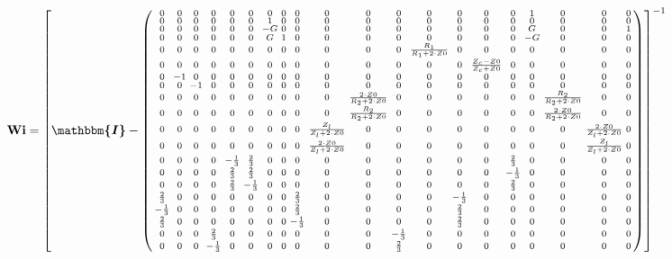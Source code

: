 \documentclass[10pt]{article} \usepackage{amsmath} \usepackage{bbold}
\begin{document}
\begin{equation} \mathbf{Wi} =  \left[ \boldsymbol{\mathbbm{I}}  -
\left(\begin{smallmatrix} 0 & 0 & 0 & 0 & 0 & 0 & 0 & 0 & 0 & 0 & 0 &
0 & 0 & 0 & 0 & 0 & 1 & 0 & 0 & 0 \\ 0 & 0 & 0 & 0 & 0 & 0 & 1 & 0 & 0
& 0 & 0 & 0 & 0 & 0 & 0 & 0 & 0 & 0 & 0 & 0 \\ 0 & 0 & 0 & 0 & 0 & 0 &
-G & 0 & 0 & 0 & 0 & 0 & 0 & 0 & 0 & 0 & G & 0 & 0 & 1 \\ 0 & 0 & 0 &
0 & 0 & 0 & G & 1 & 0 & 0 & 0 & 0 & 0 & 0 & 0 & 0 & -G & 0 & 0 & 0 \\
0 & 0 & 0 & 0 & 0 & 0 & 0 & 0 & 0 & 0 & 0 & 0 & \frac{R_1}{R_1+2\cdot
Z0} & 0 & 0 & 0 & 0 & 0 & 0 & 0 \\ 0 & 0 & 0 & 0 & 0 & 0 & 0 & 0 & 0 &
0 & 0 & 0 & 0 & 0 & \frac{ Z_c -Z0}{ Z_c +Z0} & 0 & 0 & 0 & 0 & 0 \\ 0
& -1 & 0 & 0 & 0 & 0 & 0 & 0 & 0 & 0 & 0 & 0 & 0 & 0 & 0 & 0 & 0 & 0 &
0 & 0 \\ 0 & 0 & -1 & 0 & 0 & 0 & 0 & 0 & 0 & 0 & 0 & 0 & 0 & 0 & 0 &
0 & 0 & 0 & 0 & 0 \\ 0 & 0 & 0 & 0 & 0 & 0 & 0 & 0 & 0 & 0 &
\frac{2\cdot Z0}{R_2+2\cdot Z0} & 0 & 0 & 0 & 0 & 0 & 0 &
\frac{R_2}{R_2+2\cdot Z0} & 0 & 0 \\ 0 & 0 & 0 & 0 & 0 & 0 & 0 & 0 & 0
& 0 & \frac{R_2}{R_2+2\cdot Z0} & 0 & 0 & 0 & 0 & 0 & 0 & \frac{2\cdot
Z0}{R_2+2\cdot Z0} & 0 & 0 \\ 0 & 0 & 0 & 0 & 0 & 0 & 0 & 0 & 0 &
\frac{Z_l}{Z_l+2\cdot Z0} & 0 & 0 & 0 & 0 & 0 & 0 & 0 & 0 &
\frac{2\cdot Z0}{Z_l+2\cdot Z0} & 0 \\ 0 & 0 & 0 & 0 & 0 & 0 & 0 & 0 &
0 & \frac{2\cdot Z0}{Z_l+2\cdot Z0} & 0 & 0 & 0 & 0 & 0 & 0 & 0 & 0 &
\frac{Z_l}{Z_l+2\cdot Z0} & 0 \\ 0 & 0 & 0 & 0 & -\frac{1}{3} &
\frac{2}{3} & 0 & 0 & 0 & 0 & 0 & 0 & 0 & 0 & 0 & \frac{2}{3} & 0 & 0
& 0 & 0 \\ 0 & 0 & 0 & 0 & \frac{2}{3} & \frac{2}{3} & 0 & 0 & 0 & 0 &
0 & 0 & 0 & 0 & 0 & -\frac{1}{3} & 0 & 0 & 0 & 0 \\ 0 & 0 & 0 & 0 &
\frac{2}{3} & -\frac{1}{3} & 0 & 0 & 0 & 0 & 0 & 0 & 0 & 0 & 0 &
\frac{2}{3} & 0 & 0 & 0 & 0 \\ \frac{2}{3} & 0 & 0 & 0 & 0 & 0 & 0 & 0
& \frac{2}{3} & 0 & 0 & 0 & 0 & -\frac{1}{3} & 0 & 0 & 0 & 0 & 0 & 0
\\ -\frac{1}{3} & 0 & 0 & 0 & 0 & 0 & 0 & 0 & \frac{2}{3} & 0 & 0 & 0
& 0 & \frac{2}{3} & 0 & 0 & 0 & 0 & 0 & 0 \\ \frac{2}{3} & 0 & 0 & 0 &
0 & 0 & 0 & 0 & -\frac{1}{3} & 0 & 0 & 0 & 0 & \frac{2}{3} & 0 & 0 & 0
& 0 & 0 & 0 \\ 0 & 0 & 0 & \frac{2}{3} & 0 & 0 & 0 & 0 & 0 & 0 & 0 &
-\frac{1}{3} & 0 & 0 & 0 & 0 & 0 & 0 & 0 & 0 \\ 0 & 0 & 0 &
-\frac{1}{3} & 0 & 0 & 0 & 0 & 0 & 0 & 0 & \frac{2}{3} & 0 & 0 & 0 & 0
& 0 & 0 & 0 & 0 \end{smallmatrix}\right) \right]^{-1}  \end{equation}
\end{document}
